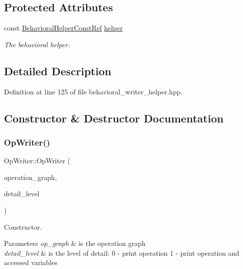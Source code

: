 \subsection*{Protected Attributes}
\begin{DoxyCompactItemize}
\item 
const \hyperlink{behavioral__helper_8hpp_aae973b54cac87eef3b27442aa3e1e425}{Behavioral\+Helper\+Const\+Ref} \hyperlink{classOpWriter_ae479e91af7726e304f6bcc1208f45e75}{helper}
\begin{DoxyCompactList}\small\item\em The behavioral helper. \end{DoxyCompactList}\end{DoxyCompactItemize}


\subsection{Detailed Description}


Definition at line 125 of file behavioral\+\_\+writer\+\_\+helper.\+hpp.



\subsection{Constructor \& Destructor Documentation}
\mbox{\label{classOpWriter_a236c995006cfce8a9b9984ced76ea9cc}} 
\subsubsection{\texorpdfstring{Op\+Writer()}{OpWriter()}}
{\footnotesize\ttfamily Op\+Writer\+::\+Op\+Writer (\begin{DoxyParamCaption}\item[{const \hyperlink{structOpGraph}{Op\+Graph} $\ast$}]{operation\+\_\+graph,  }\item[{const int}]{detail\+\_\+level }\end{DoxyParamCaption})}



Constructor. 


\begin{DoxyParams}{Parameters}
{\em op\+\_\+graph} & is the operation graph \\
\hline
{\em detail\+\_\+level} & is the level of detail\+: 0 -\/ print operation 1 -\/ print operation and accessed variables \\
\hline
\end{DoxyParams}


